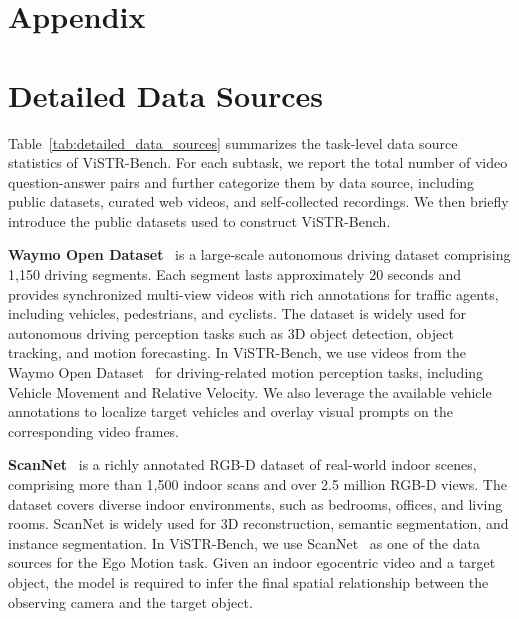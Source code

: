 \clearpage

{
    \hypersetup{linkcolor=black}
    \tableofcontents
}

\clearpage
\appendix

\section*{Appendix}

\section{Detailed Data Sources}
\label{sec:detailed_data_sources}

Table~\ref{tab:detailed_data_sources} summarizes the task-level data source statistics of ViSTR-Bench.
For each subtask, we report the total number of video question-answer pairs and further categorize them by data source, including public datasets, curated web videos, and self-collected recordings.
We then briefly introduce the public datasets used to construct ViSTR-Bench.

\noindent\textbf{Waymo Open Dataset}~\citep{Waymo} is a large-scale autonomous driving dataset comprising 1,150 driving segments. Each segment lasts approximately 20 seconds and provides synchronized multi-view videos with rich annotations for traffic agents, including vehicles, pedestrians, and cyclists. The dataset is widely used for autonomous driving perception tasks such as 3D object detection, object tracking, and motion forecasting.
In ViSTR-Bench, we use videos from the Waymo Open Dataset~\citep{Waymo} for driving-related motion perception tasks, including Vehicle Movement and Relative Velocity. We also leverage the available vehicle annotations to localize target vehicles and overlay visual prompts on the corresponding video frames.

\noindent\textbf{ScanNet}~\citep{ScanNet} is a richly annotated RGB-D dataset of real-world indoor scenes, comprising more than 1,500 indoor scans and over 2.5 million RGB-D views. The dataset covers diverse indoor environments, such as bedrooms, offices, and living rooms. ScanNet is widely used for 3D reconstruction, semantic segmentation, and instance segmentation.
In ViSTR-Bench, we use ScanNet~\citep{ScanNet} as one of the data sources for the Ego Motion task. Given an indoor egocentric video and a target object, the model is required to infer the final spatial relationship between the observing camera and the target object.

